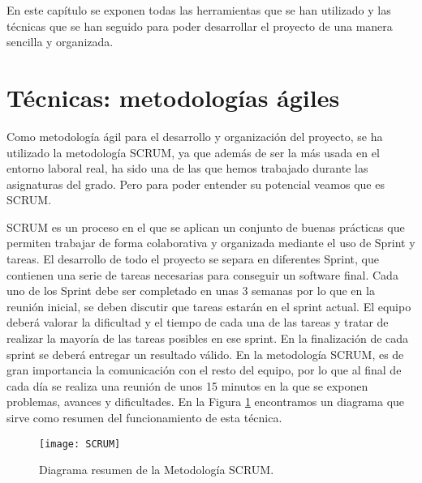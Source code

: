
En este capítulo se exponen todas las herramientas que se han utilizado y las técnicas que se han seguido para poder desarrollar el proyecto de una manera sencilla y organizada. 

\section{Técnicas: metodologías ágiles } \label{sec:HMetodologiasAgiles}
Como metodología ágil \cite{MetodologiasAgiles} para el desarrollo y organización del proyecto, se ha utilizado la metodología SCRUM, ya que además de ser la más usada en el entorno laboral real, ha sido una de las que hemos trabajado durante las asignaturas del grado. Pero para poder entender su potencial veamos que es SCRUM.

SCRUM es un proceso en el que se aplican un conjunto de buenas prácticas que permiten trabajar de forma colaborativa y organizada mediante el uso de Sprint y tareas. 
El desarrollo de todo el proyecto se separa en diferentes Sprint, que contienen una serie de tareas necesarias para conseguir un software final. Cada uno de los Sprint debe ser completado en unas 3 semanas por lo que en la reunión inicial, se deben discutir que tareas estarán en el sprint actual. El equipo deberá valorar la dificultad y el tiempo de cada una de las tareas y tratar de realizar la mayoría de las tareas posibles en ese sprint. En la finalización de cada sprint se deberá entregar un resultado válido. 
En la metodología SCRUM, es de gran importancia la comunicación con el resto del equipo, por lo que al final de cada día se realiza una reunión de unos 15 minutos en la que se exponen problemas, avances y dificultades. En la Figura \ref{diagSrum} encontramos un diagrama que sirve como resumen del funcionamiento de esta técnica.


\begin{figure}[!h]
	\centering
	\texttt{[image: SCRUM]}
	\caption{Diagrama resumen de la Metodología SCRUM. \cite{SCRUM}}\label{diagSrum}
\end{figure}

